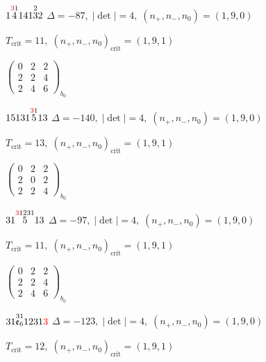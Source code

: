 \documentclass[10pt]{article}
\begin{document}
\smallskip

$1\overset{\textcolor{red}{3}1}{4}141\overset{2}{3}2$ \quad $\Delta=-87,\; |\det|=4,\; (n_+,n_-,n_0)=(1,9,0)$

\hspace{1em}$T_{\text{crit}}=11,\; (n_+,n_-,n_0)_{\text{crit}}=(1,9,1)$

\hspace{2em}$\left(\begin{smallmatrix}0 & 2 & 2 \\ 2 & 2 & 4 \\ 2 & 4 & 6\end{smallmatrix}\right)_{\!b_0}$

\smallskip

$15131\overset{\textcolor{red}{3}1}{5}13$ \quad $\Delta=-140,\; |\det|=4,\; (n_+,n_-,n_0)=(1,9,0)$

\hspace{1em}$T_{\text{crit}}=13,\; (n_+,n_-,n_0)_{\text{crit}}=(1,9,1)$

\hspace{2em}$\left(\begin{smallmatrix}0 & 2 & 2 \\ 2 & 0 & 2 \\ 2 & 2 & 4\end{smallmatrix}\right)_{\!b_0}$

\smallskip

$31\overset{\textcolor{red}{3}1231}{5}13$ \quad $\Delta=-97,\; |\det|=4,\; (n_+,n_-,n_0)=(1,9,0)$

\hspace{1em}$T_{\text{crit}}=11,\; (n_+,n_-,n_0)_{\text{crit}}=(1,9,1)$

\hspace{2em}$\left(\begin{smallmatrix}0 & 2 & 2 \\ 2 & 2 & 4 \\ 2 & 4 & 6\end{smallmatrix}\right)_{\!b_0}$

\smallskip

$31\overset{31}{\mathfrak{e}_6}1231\textcolor{red}{3}$ \quad $\Delta=-123,\; |\det|=4,\; (n_+,n_-,n_0)=(1,9,0)$

\hspace{1em}$T_{\text{crit}}=12,\; (n_+,n_-,n_0)_{\text{crit}}=(1,9,1)$
\end{document}
